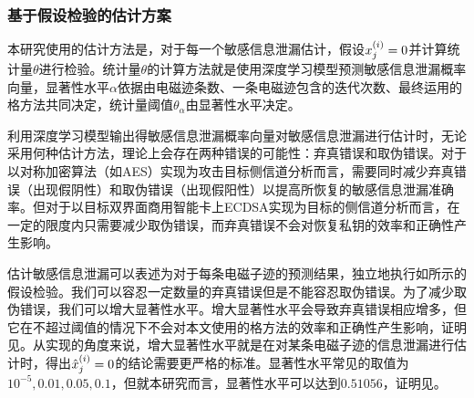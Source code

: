 {\begin{figure}[!h]
		\label{fig:mydlscatestecdsa}
	\end{figure}
	\subsubsection{基于假设检验的估计方案}
	本研究使用的估计方法是，对于每一个敏感信息泄漏估计，假设$x^{(i)}_j=0$并计算统计量$\theta$进行检验。统计量$\theta$的计算方法就是使用深度学习模型预测敏感信息泄漏概率向量，显著性水平$\alpha$依据由电磁迹条数、一条电磁迹包含的迭代次数、最终运用的格方法共同决定，统计量阈值$\theta_{\alpha}$由显著性水平决定。
	
	利用深度学习模型输出得敏感信息泄漏概率向量对敏感信息泄漏进行估计时，无论采用何种估计方法，理论上会存在两种错误的可能性：弃真错误和取伪错误。对于以对称加密算法（如AES）实现为攻击目标侧信道分析而言，需要同时减少弃真错误（出现假阴性）和取伪错误（出现假阳性）以提高所恢复的敏感信息泄漏准确率。但对于以目标双界面商用智能卡上ECDSA实现为目标的侧信道分析而言，在一定的限度内只需要减少取伪错误，而弃真错误不会对恢复私钥的效率和正确性产生影响。
	
	估计敏感信息泄漏可以表述为对于每条电磁子迹的预测结果，独立地执行如所示的假设检验。我们可以容忍一定数量的弃真错误但是不能容忍取伪错误。为了减少取伪错误，我们可以增大显著性水平。增大显著性水平会导致弃真错误相应增多，但它在不超过阈值的情况下不会对本文使用的格方法的效率和正确性产生影响，证明见。从实现的角度来说，增大显著性水平就是在对某条电磁子迹的信息泄漏进行估计时，得出$\hat{x}^{(i)}_j=0$的结论需要更严格的标准。显著性水平常见的取值为$10^{-5},0.01,0.05,0.1$，但就本研究而言，显著性水平可以达到$0.51056$，证明见。
	
}
